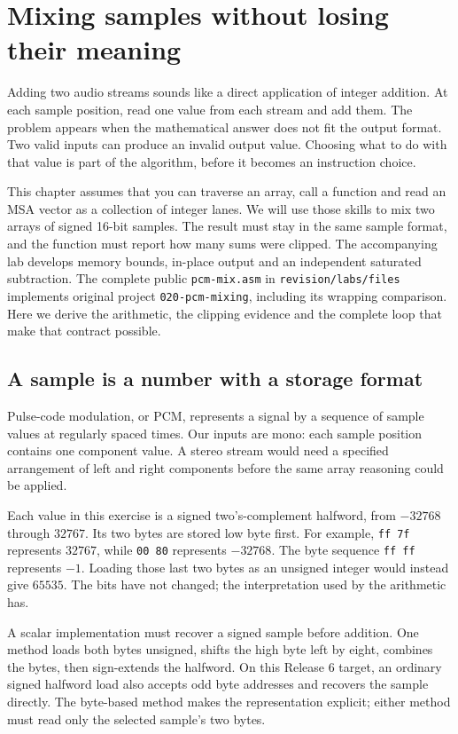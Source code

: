 \chapter{Mixing samples without losing their meaning}
\label{revision:pcm-mixing}

Adding two audio streams sounds like a direct application of integer addition.
At each sample position, read one value from each stream and add them. The
problem appears when the mathematical answer does not fit the output format.
Two valid inputs can produce an invalid output value. Choosing what to do with
that value is part of the algorithm, before it becomes an instruction choice.

This chapter assumes that you can traverse an array, call a function and read
an MSA vector as a collection of integer lanes. We will use those skills to mix
two arrays of signed 16-bit samples. The result must stay in the same sample
format, and the function must report how many sums were clipped. The accompanying
lab develops memory bounds, in-place output and an independent saturated
subtraction. The complete public \texttt{pcm-mix.asm} in
\texttt{revision/labs/files} implements original project \texttt{020-pcm-mixing},
including its wrapping comparison. Here we derive the arithmetic, the clipping
evidence and the complete loop that make that contract possible.

\section{A sample is a number with a storage format}

Pulse-code modulation, or PCM, represents a signal by a sequence of sample values
at regularly spaced times. Our inputs are mono: each sample position contains
one component value. A stereo stream would need a specified arrangement of left
and right components before the same array reasoning could be applied.

Each value in this exercise is a signed two's-complement halfword, from $-32768$
through $32767$. Its two bytes are stored low byte first. For example,
\texttt{ff 7f} represents $32767$, while \texttt{00 80} represents $-32768$.
The byte sequence \texttt{ff ff} represents $-1$. Loading those last two bytes as
an unsigned integer would instead give $65535$. The bits have not changed;
the interpretation used by the arithmetic has.

A scalar implementation must recover a signed sample before addition. One method
loads both bytes unsigned, shifts the high byte left by eight, combines the bytes,
then sign-extends the halfword. On this Release 6 target, an ordinary signed
halfword load also accepts odd byte addresses and recovers the sample directly.
The byte-based method makes the representation explicit; either method must read
only the selected sample's two bytes.

